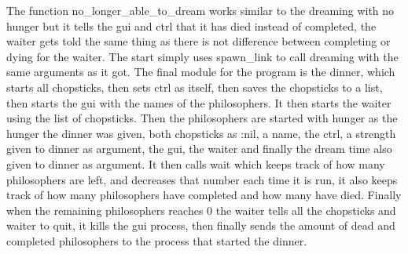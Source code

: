 \documentclass[a4paper,11pt]{article}
\begin{document}
The function no\_longer\_able\_to\_dream works similar to the dreaming with no hunger but it tells the gui and ctrl that it has died instead of completed, the waiter gets told the same thing as there is not difference between completing or dying for the waiter.
The start simply uses spawn\_link to call dreaming with the same arguments as it got.
The final module for the program is the dinner, which starts all chopsticks, then sets ctrl as itself, then saves the chopsticks to a list, then starts the gui with the names of the philosophers. It then starts the waiter using the list of chopsticks. Then the philosophers are started with hunger as the hunger the dinner was given, 
both chopsticks as :nil, a name, the ctrl, a strength given to dinner as argument, the gui, the waiter and finally the dream time also given to dinner as argument. 
It then calls wait which keeps track of how many philosophers are left, and decreases that number each time it is run, it also keeps track of how many philosophers have completed and how many have died. Finally when the remaining philosophers reaches 0 the waiter tells all the chopsticks and waiter to quit, it kills the gui process, then finally 
sends the amount of dead and completed philosophers to the process that started the dinner. 
\end{document}
